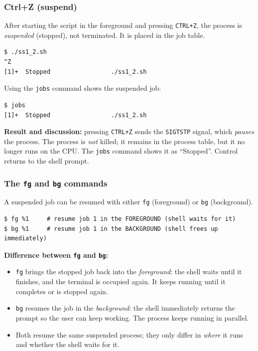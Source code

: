 \documentclass[11pt,a4paper]{article}
\begin{document}
\subsubsection*{Ctrl+Z (suspend)}
After starting the script in the foreground and pressing \texttt{CTRL+Z}, the process is
\emph{suspended} (stopped), not terminated. It is placed in the job table.

\begin{lstlisting}[style=bashstyle]
$ ./ss1_2.sh
^Z
[1]+  Stopped                 ./ss1_2.sh
\end{lstlisting}

Using the \texttt{jobs} command shows the suspended job:

\begin{lstlisting}[style=bashstyle]
$ jobs
[1]+  Stopped                 ./ss1_2.sh
\end{lstlisting}

\textbf{Result and discussion:} pressing \texttt{CTRL+Z} sends the \texttt{SIGTSTP}
signal, which \emph{pauses} the process. The process is \emph{not} killed; it remains in the
process table, but it no longer runs on the CPU. The \texttt{jobs} command shows it as
``Stopped''. Control returns to the shell prompt.

\subsubsection*{The \texttt{fg} and \texttt{bg} commands}
A suspended job can be resumed with either \texttt{fg} (foreground) or \texttt{bg}
(background).

\begin{lstlisting}[style=bashstyle]
$ fg %1     # resume job 1 in the FOREGROUND (shell waits for it)
$ bg %1     # resume job 1 in the BACKGROUND (shell frees up immediately)
\end{lstlisting}

\textbf{Difference between \texttt{fg} and \texttt{bg}:}
\begin{itemize}[leftmargin=2em]
  \item \texttt{fg} brings the stopped job back into the \emph{foreground}: the shell waits
        until it finishes, and the terminal is occupied again. It keeps running until it
        completes or is stopped again.
  \item \texttt{bg} resumes the job in the \emph{background}: the shell immediately returns
        the prompt so the user can keep working. The process keeps running in parallel.
  \item Both resume the same suspended process; they only differ in \emph{where} it runs and
        whether the shell waits for it.
\end{itemize}
\end{document}
